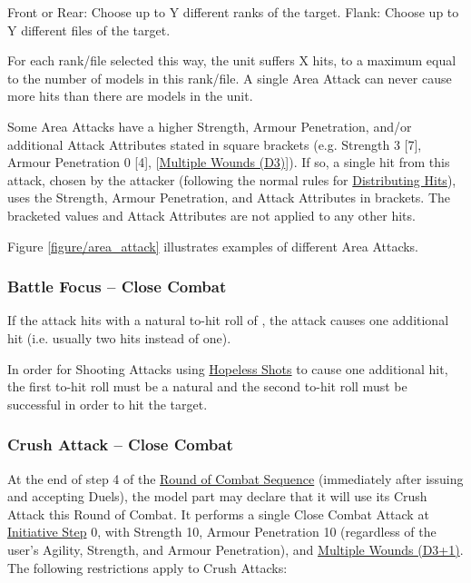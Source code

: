 Front or Rear: Choose up to Y different ranks of the target.\newline
Flank: Choose up to Y different files of the target.

For each rank/file selected this way, the unit suffers X hits, to a maximum equal to the number of models in this rank/file. A single Area Attack can never cause more hits than there are models in the unit.

Some Area Attacks have a higher Strength, Armour Penetration, and/or additional Attack Attributes stated in square brackets (e.g. Strength 3 [7], Armour Penetration 0 [4], [\hyperref[multiple_wounds]{Multiple Wounds (D3)}]). If so, a single hit from this attack, chosen by the attacker (following the normal rules for \hyperref[distributing_hits]{Distributing Hits}), uses the Strength, Armour Penetration, and Attack Attributes in brackets. The bracketed values and Attack Attributes are not applied to any other hits.

Figure \ref{figure/area_attack} illustrates examples of different Area Attacks.

\subsubsection{Battle Focus -- Close Combat}
\idx[main=y]{\battlefocus}\label{battle_focus}

If the attack hits with a natural to-hit roll of , the attack causes one additional hit (i.e. usually two hits instead of one).

In order for Shooting Attacks using \hyperref[hopeless_shots]{Hopeless Shots} to cause one additional hit, the first to-hit roll must be a natural  and the second to-hit roll must be successful in order to hit the target.

\subsubsection{Crush Attack -- Close Combat}
\idx[main=y]{\crushattack}\label{crush_attack}

At the end of step 4 of the \hyperref[round_of_combat_sequence]{Round of Combat Sequence} (immediately after issuing and accepting Duels), the model part may declare that it will use its Crush Attack this Round of Combat. It performs a single Close Combat Attack at \hyperref[initiative_order]{Initiative Step} 0, with Strength 10, Armour Penetration 10 (regardless of the user's Agility, Strength, and Armour Penetration), and \hyperref[multiple_wounds]{Multiple Wounds (D3+1)}. The following restrictions apply to Crush Attacks:

